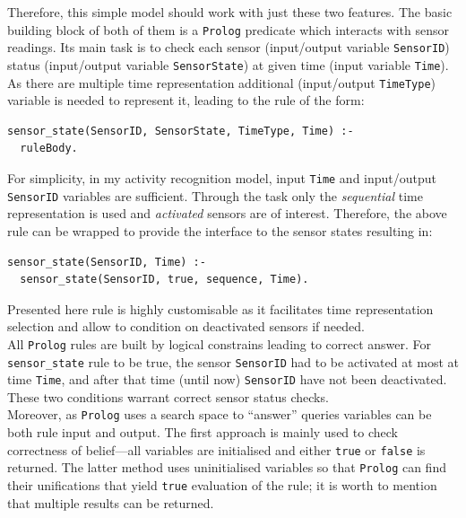 \documentclass[11pt, a4paper, pdflatex, leqno, twoside, openright]{report}
\begin{document}
Therefore, this simple model should work with just these two features. The basic building block of both of them is a \texttt{Prolog} predicate which interacts with sensor readings. Its main task is to check each sensor (input/output variable \texttt{SensorID}) status (input/output variable \texttt{SensorState}) at given time (input variable \texttt{Time}). As there are multiple time representation additional (input/output \texttt{TimeType}) variable is needed to represent it, leading to the rule of the form:\\
\begin{verbatim}
sensor_state(SensorID, SensorState, TimeType, Time) :-
  ruleBody.
\end{verbatim}
For simplicity, in my activity recognition model, input \texttt{Time} and input/output \texttt{SensorID} variables are sufficient. Through the task only the \emph{sequential} time representation is used and \emph{activated} sensors are of interest. Therefore, the above rule can be wrapped to provide the interface to the sensor states resulting in:\\
\begin{verbatim}
sensor_state(SensorID, Time) :-
  sensor_state(SensorID, true, sequence, Time).
\end{verbatim}
Presented here rule is highly customisable as it facilitates time representation selection and allow to condition on deactivated sensors if needed.\\
All \texttt{Prolog} rules are built by logical constrains leading to correct answer. For \texttt{sensor\_state} rule to be true, the sensor \texttt{SensorID} had to be activated at most at time \texttt{Time}, and after that time (until now) \texttt{SensorID} have not been deactivated. These two conditions warrant correct sensor status checks.\\
Moreover, as \texttt{Prolog} uses a search space to ``answer'' queries variables can be both rule input and output. The first approach is mainly used to check correctness of belief---all variables are initialised and either \texttt{true} or \texttt{false} is returned. The latter method uses uninitialised variables so that \texttt{Prolog} can find their unifications that yield \texttt{true} evaluation of the rule; it is worth to mention that multiple results can be returned.\\
\end{document}
